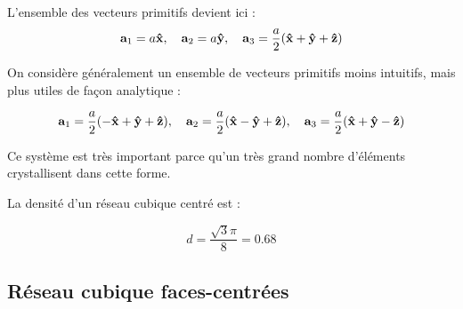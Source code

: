 L'ensemble des vecteurs primitifs devient ici :
\begin{equation}
\mathbf{a}_1 = a\mathbf{\hat{x}},\quad\mathbf{a}_2 = a\mathbf{\hat{y}},\quad \mathbf{a}_3 = \frac{a}{2}(\mathbf{\hat{x}}+\mathbf{\hat{y}}+\mathbf{\hat{z}})
\end{equation}

On considère généralement un ensemble de vecteurs primitifs moins intuitifs, mais plus utiles de façon analytique :

\begin{equation}
    \mathbf{a}_1 = \frac{a}{2}(-\mathbf{\hat{x}}+\mathbf{\hat{y}}+\mathbf{\hat{z}}),
    \quad
    \mathbf{a}_2 = \frac{a}{2}(\mathbf{\hat{x}}-\mathbf{\hat{y}}+\mathbf{\hat{z}}),
    \quad
    \mathbf{a}_3 = \frac{a}{2}(\mathbf{\hat{x}}+\mathbf{\hat{y}}-\mathbf{\hat{z}})
\end{equation}

Ce système est très important parce qu'un très grand nombre d'éléments crystallisent dans cette forme.

La densité d'un réseau cubique centré est :

\begin{equation}
d = \frac{\sqrt{3}\pi}{8} = 0.68
\end{equation}

\subsection{Réseau cubique faces-centrées} 


